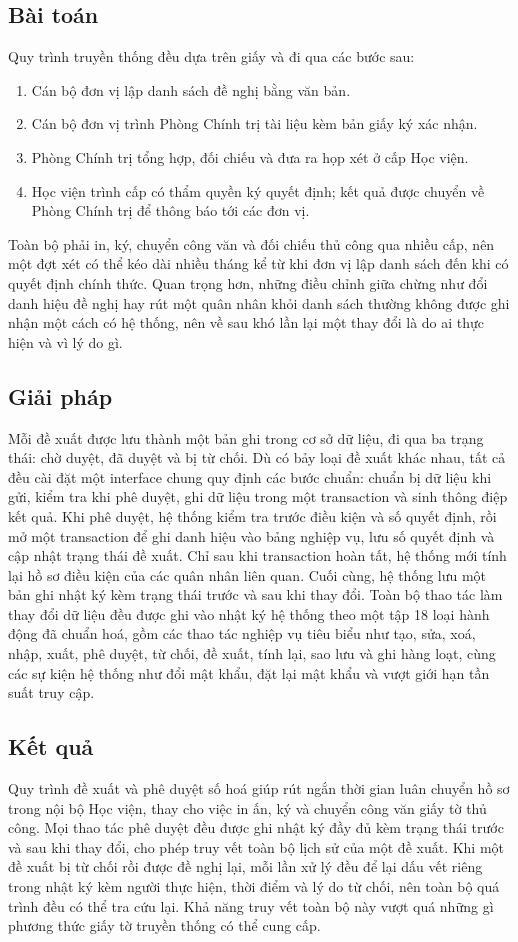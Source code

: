 \documentclass[../DoAn.tex]{subfiles}
\begin{document}
\subsection{Bài toán}
Quy trình truyền thống đều dựa trên giấy và đi qua các bước sau:
\begin{enumerate}
\item Cán bộ đơn vị lập danh sách đề nghị bằng văn bản.
\item Cán bộ đơn vị trình Phòng Chính trị tài liệu kèm bản giấy ký xác nhận.
\item Phòng Chính trị tổng hợp, đối chiếu và đưa ra họp xét ở cấp Học viện.
\item Học viện trình cấp có thẩm quyền ký quyết định; kết quả được chuyển về Phòng Chính trị để thông báo tới các đơn vị.
\end{enumerate}
Toàn bộ phải in, ký, chuyển công văn và đối chiếu thủ công qua nhiều cấp, nên một đợt xét có thể kéo dài nhiều tháng kể từ khi đơn vị lập danh sách đến khi có quyết định chính thức.
Quan trọng hơn, những điều chỉnh giữa chừng như đổi danh hiệu đề nghị hay rút một quân nhân khỏi danh sách thường không được ghi nhận một cách có hệ thống, nên về sau khó lần lại một thay đổi là do ai thực hiện và vì lý do gì.

\subsection{Giải pháp}
Mỗi đề xuất được lưu thành một bản ghi trong cơ sở dữ liệu, đi qua ba trạng thái: chờ duyệt, đã duyệt và bị từ chối.
Dù có bảy loại đề xuất khác nhau, tất cả đều cài đặt một interface chung quy định các bước chuẩn: chuẩn bị dữ liệu khi gửi, kiểm tra khi phê duyệt, ghi dữ liệu trong một transaction và sinh thông điệp kết quả.
Khi phê duyệt, hệ thống kiểm tra trước điều kiện và số quyết định, rồi mở một transaction để ghi danh hiệu vào bảng nghiệp vụ, lưu số quyết định và cập nhật trạng thái đề xuất.
Chỉ sau khi transaction hoàn tất, hệ thống mới tính lại hồ sơ điều kiện của các quân nhân liên quan.
Cuối cùng, hệ thống lưu một bản ghi nhật ký kèm trạng thái trước và sau khi thay đổi.
Toàn bộ thao tác làm thay đổi dữ liệu đều được ghi vào nhật ký hệ thống theo một tập 18 loại hành động đã chuẩn hoá, gồm các thao tác nghiệp vụ tiêu biểu như tạo, sửa, xoá, nhập, xuất, phê duyệt, từ chối, đề xuất, tính lại, sao lưu và ghi hàng loạt, cùng các sự kiện hệ thống như đổi mật khẩu, đặt lại mật khẩu và vượt giới hạn tần suất truy cập.

\subsection{Kết quả}
Quy trình đề xuất và phê duyệt số hoá giúp rút ngắn thời gian luân chuyển hồ sơ trong nội bộ Học viện, thay cho việc in ấn, ký và chuyển công văn giấy tờ thủ công.
Mọi thao tác phê duyệt đều được ghi nhật ký đầy đủ kèm trạng thái trước và sau khi thay đổi, cho phép truy vết toàn bộ lịch sử của một đề xuất.
Khi một đề xuất bị từ chối rồi được đề nghị lại, mỗi lần xử lý đều để lại dấu vết riêng trong nhật ký kèm người thực hiện, thời điểm và lý do từ chối, nên toàn bộ quá trình đều có thể tra cứu lại.
Khả năng truy vết toàn bộ này vượt quá những gì phương thức giấy tờ truyền thống có thể cung cấp.
\end{document}
